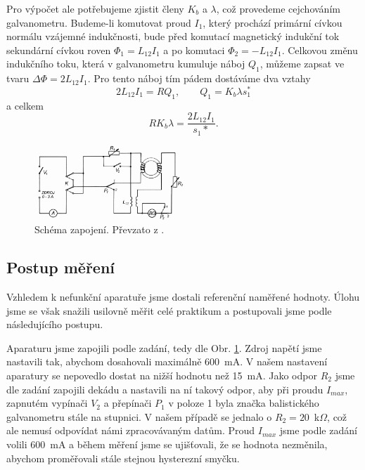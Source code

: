 \documentclass[english]{article}
\begin{document}
		Pro výpočet ale potřebujeme zjistit členy $K_b$ a $\lambda$, což provedeme cejchováním galvanometru. Budeme-li komutovat proud $I_1$, který prochází primární cívkou normálu vzájemné indukčnosti, bude před komutací magnetický indukční tok sekundární cívkou roven $\Phi_1 = L_{12}I_1$ a po komutaci $\Phi_2 = - L_{12}I_1$. Celkovou změnu indukčního toku, která v galvanometru kumuluje náboj $Q_1$, můžeme zapsat ve tvaru $\Delta \Phi = 2 L_{12} I_1$. Pro tento náboj tím pádem dostáváme dva vztahy
		\begin{equation}
		2 L_{12} I_1 = R Q_1, \qquad Q_1 = K_b \lambda s_1^*
		\end{equation}
		a celkem
		\begin{equation} \label{eq:rkblambda}
		R K_b \lambda = \frac{2 L_{12} I_1}{s_1*}.
		\end{equation}
		
		\begin{figure}[hbt]
		\centering
		\includegraphics[width=0.5\textwidth]{att/schema.pdf}
		\caption{Schéma zapojení. Převzato z \cite{bib:zadani}. }
		\label{fig:schema}
		\end{figure}
				
	\subsection{Postup měření}
		Vzhledem k nefunkční aparatuře jsme dostali referenční naměřené hodnoty. Úlohu jsme se však snažili usilovně měřit celé praktikum a postupovali jsme podle následujícího postupu. 
		
		Aparaturu jsme zapojili podle zadání, tedy dle Obr. \ref{fig:schema}. Zdroj napětí jsme nastavili tak, abychom dosahovali maximálně 600~mA. V našem nastavení aparatury se nepovedlo dostat na nižší hodnotu než 15~mA. Jako odpor $R_2$ jsme dle zadání zapojili dekádu a nastavili na ní takový odpor, aby při proudu $I_{max}$, zapnutém vypínači $V_2$ a přepínači $P_1$ v poloze 1 byla značka balistického galvanometru stále na stupnici. V našem případě se jednalo o $R_2 = 20$~k$\Omega$, což ale nemusí odpovídat námi zpracovávaným datům. Proud $I_{max}$ jsme podle zadání volili 600~mA a během měření jsme se ujišťovali, že se hodnota nezměnila, abychom proměřovali stále stejnou hysterezní smyčku.
		
\end{document}
